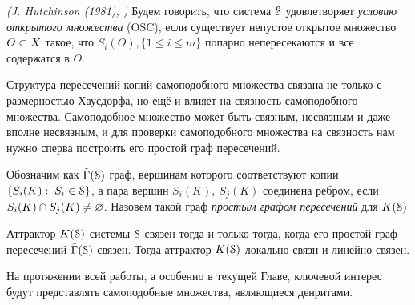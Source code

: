 \begin{definition}{\em (J. Hutchinson (1981), \cite{Hut1981})}\label{dfn:osc}
Будем говорить, что система ${{\EuScript S}}$ удовлетворяет {\em условию открытого множества} (OSC), если существует непустое открытое множество $O \subset X$ такое, что $S_i(O), \{1\le i\le m\}$ попарно непересекаются и все содержатся в $O$.
\end{definition}

Структура пересечений копий самоподобного множества связана не только с размерностью Хаусдорфа, но ещё и влияет на связность самоподобного множества.
Самоподобное множество может быть связным, несвязным и даже вполне несвязным, и для проверки самоподобного множества на связность нам нужно сперва построить его простой граф пересечений. 

\begin{definition}
Обозначим как $\tilde{\Gamma}({\EuScript S})$ граф, вершинам которого соответствуют копии $\{S_i(K):\; S_i\in {\EuScript S}\}$, а пара вершин $S_i(K),\ S_j(K)$ соединена ребром, если $S_i(K)\cap S_j(K)\neq\varnothing$.
Назовём такой граф {\em простым графом пересечений} для $K({\EuScript S})$ 
\end{definition}

\begin{theorem}
Аттрактор $K({\EuScript S})$ системы ${\EuScript S}$ связен тогда и только тогда, когда его простой граф пересечений $\tilde{\Gamma}({\EuScript S})$ связен.
Тогда аттрактор $K({\EuScript S})$ локально связн и линейно связен.
\end{theorem}

%

На протяжении всей работы, а особенно в текущей Главе, ключевой интерес будут представлять самоподобные множества, являющиеся денритами. 

